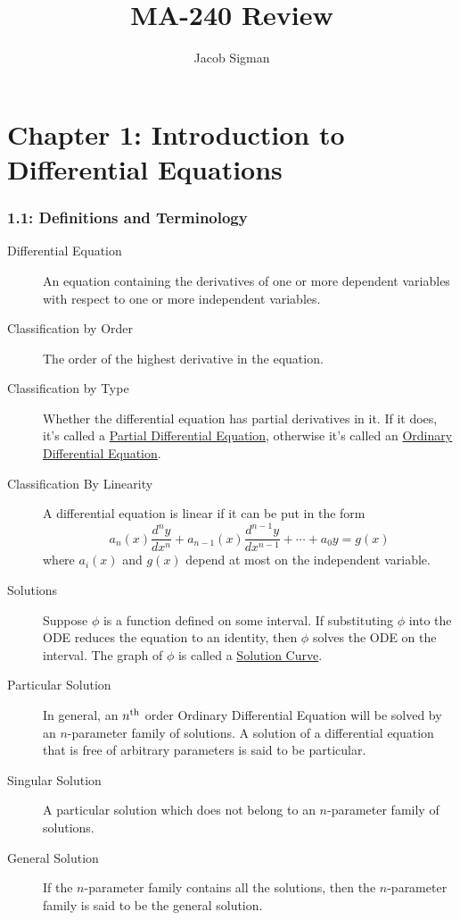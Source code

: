 \documentclass{article}
\title{MA-240 Review}
\author{Jacob Sigman}
\date{}
\begin{document}
\maketitle
\tableofcontents
\newpage
\part*{Chapter 1: Introduction to Differential Equations}
\section*{1.1: Definitions and Terminology}
\begin{description}
    \item [Differential Equation] An equation containing the derivatives of one or more dependent variables with respect to one or more independent variables.
    \item [Classification by Order] The order of the highest derivative in the equation.
    \item [Classification by Type] Whether the differential equation has partial derivatives in it. If it does, it's called a \underline{Partial Differential Equation}, otherwise it's called an \underline{Ordinary Differential Equation}.
    \item [Classification By Linearity] A differential equation is linear if it can be put in the form \[a_n(x)\frac{d^ny}{dx^n}+a_{n-1}(x)\frac{d^{n-1}y}{dx^{n-1}}+\cdots+a_0y=g(x)\] where \(a_i(x)\) and \(g(x)\) depend at most on the independent variable.
    \item [Solutions] Suppose \(\phi\) is a function defined on some interval. If substituting \(\phi\) into the ODE reduces the equation to an identity, then \(\phi\) solves the ODE on the interval. The graph of \(\phi\) is called a \underline{Solution Curve}.
    \item [Particular Solution] In general, an \(n^\textnormal{th}\) order Ordinary Differential Equation will be solved by an \(n\)-parameter family of solutions. A solution of a differential equation that is free of arbitrary parameters is said to be particular.
    \item [Singular Solution] A particular solution which does not belong to an \(n\)-parameter family of solutions.
    \item [General Solution] If the \(n\)-parameter family contains all the solutions, then the \(n\)-parameter family is said to be the general solution.
\end{description}
\end{document}
